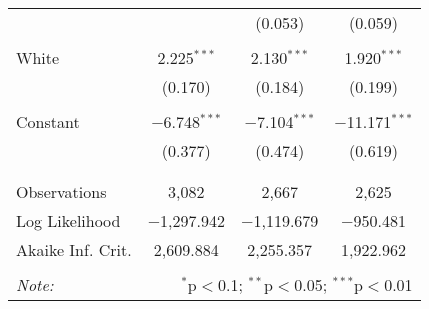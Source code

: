 \begin{table}[!htbp]
\begin{tabular}{@{\extracolsep{5pt}}lccc}
  &  & (0.053) & (0.059) \\ 
  & & & \\ 
 White & 2.225$^{***}$ & 2.130$^{***}$ & 1.920$^{***}$ \\ 
  & (0.170) & (0.184) & (0.199) \\ 
  & & & \\ 
 Constant & $-$6.748$^{***}$ & $-$7.104$^{***}$ & $-$11.171$^{***}$ \\ 
  & (0.377) & (0.474) & (0.619) \\ 
  & & & \\ 
\hline \\[-1.8ex] 
Observations & 3,082 & 2,667 & 2,625 \\ 
Log Likelihood & $-$1,297.942 & $-$1,119.679 & $-$950.481 \\ 
Akaike Inf. Crit. & 2,609.884 & 2,255.357 & 1,922.962 \\ 
\hline 
\hline \\[-1.8ex] 
\textit{Note:}  & \multicolumn{3}{r}{$^{*}$p$<$0.1; $^{**}$p$<$0.05; $^{***}$p$<$0.01} \\ 
\end{tabular} 
\end{table} 
